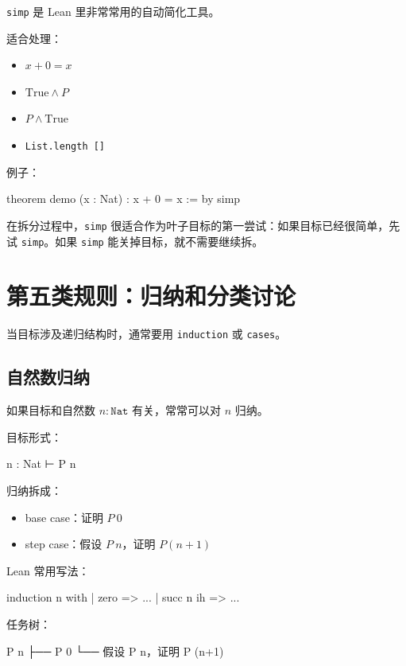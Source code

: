 \documentclass[UTF8,12pt]{ctexart}
\begin{document}
\texttt{simp} 是 Lean 里非常常用的自动简化工具。

适合处理：
\begin{itemize}
  \item \(x + 0 = x\)
  \item \(\mathrm{True} \land P\)
  \item \(P \land \mathrm{True}\)
  \item \texttt{List.length []}
\end{itemize}

例子：

\begin{LeanCode}
theorem demo (x : Nat) : x + 0 = x := by
  simp
\end{LeanCode}

在拆分过程中，\texttt{simp} 很适合作为叶子目标的第一尝试：如果目标已经很简单，先试 \texttt{simp}。如果 \texttt{simp} 能关掉目标，就不需要继续拆。

\section{第五类规则：归纳和分类讨论}

当目标涉及递归结构时，通常要用 \texttt{induction} 或 \texttt{cases}。

\subsection{自然数归纳}

如果目标和自然数 \(n : \texttt{Nat}\) 有关，常常可以对 \(n\) 归纳。

目标形式：

\begin{LeanCode}
n : Nat
⊢ P n
\end{LeanCode}

归纳拆成：
\begin{itemize}
  \item base case：证明 \(P\ 0\)
  \item step case：假设 \(P\ n\)，证明 \(P(n+1)\)
\end{itemize}

Lean 常用写法：

\begin{LeanCode}
induction n with
| zero =>
  ...
| succ n ih =>
  ...
\end{LeanCode}

任务树：

\begin{Tree}
P n
├── P 0
└── 假设 P n，证明 P (n+1)
\end{Tree}
\end{document}
